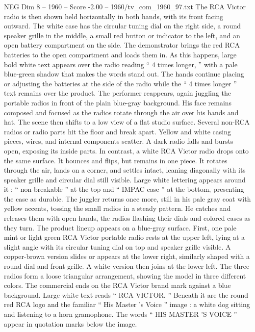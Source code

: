 \begin{textsample}{NEG Dim 8 – 1960 – Score -2.00 – 1960/tv\_com\_1960\_97.txt}
The RCA Victor radio is then shown held horizontally in both hands, with its front facing outward.
The white case has the circular tuning dial on the right side, a round speaker grille in the middle, a small red button or indicator to the left, and an open battery compartment on the side.
The demonstrator brings the red RCA batteries to the open compartment and loads them in.
As this happens, large bold white text appears over the radio reading “ 4 times longer, ” with a pale blue-green shadow that makes the words stand out.
The hands continue placing or adjusting the batteries at the side of the radio while the “ 4 times longer ” text remains over the product.
The performer reappears, again juggling the portable radios in front of the plain blue-gray background.
His face remains composed and focused as the radios rotate through the air over his hands and hat.
The scene then shifts to a low view of a flat studio surface.
Several non-RCA radios or radio parts hit the floor and break apart.
Yellow and white casing pieces, wires, and internal components scatter.
A dark radio falls and bursts open, exposing its inside parts.
In contrast, a white RCA Victor radio drops onto the same surface.
It bounces and flips, but remains in one piece.
It rotates through the air, lands on a corner, and settles intact, leaning diagonally with its speaker grille and circular dial still visible.
Large white lettering appears around it : “ non-breakable ” at the top and “ IMPAC case ” at the bottom, presenting the case as durable.
The juggler returns once more, still in his pale gray coat with yellow accents, tossing the small radios in a steady pattern.
He catches and releases them with open hands, the radios flashing their dials and colored cases as they turn.
The product lineup appears on a blue-gray surface.
First, one pale mint or light green RCA Victor portable radio rests at the upper left, lying at a slight angle with its circular tuning dial on top and speaker grille visible.
A copper-brown version slides or appears at the lower right, similarly shaped with a round dial and front grille.
A white version then joins at the lower left.
The three radios form a loose triangular arrangement, showing the model in three different colors.
The commercial ends on the RCA Victor brand mark against a blue background.
Large white text reads “ RCA VICTOR. ” Beneath it are the round red RCA logo and the familiar “ His Master ’s Voice ” image : a white dog sitting and listening to a horn gramophone.
The words “ HIS MASTER ’S VOICE ” appear in quotation marks below the image.

\end{textsample}
